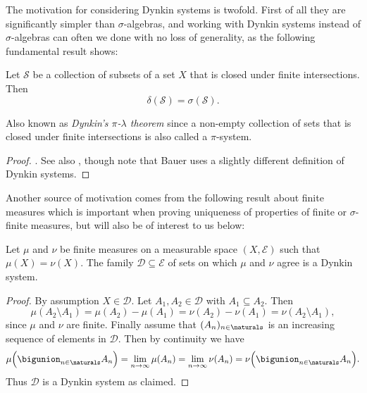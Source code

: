 \documentclass[article, a4paper, 11pt, oneside]{memoir}
\numberwithin{equation}{chapter}
\newcommand{\calE}{\mathcal{E}}
\newcommand{\calD}{\mathcal{D}}
\newcommand{\calS}{\mathcal{S}}
\begin{document}
The motivation for considering Dynkin systems is twofold. First of all they are significantly simpler than $\sigma$-algebras, and working with Dynkin systems instead of $\sigma$-algebras can often we done with no loss of generality, as the following fundamental result shows:

\begin{theorem}
    Let $\calS$ be a collection of subsets of a set $X$ that is closed under finite intersections. Then
    \begin{equation*}
        \delta(\calS) = \sigma(\calS).
    \end{equation*}
\end{theorem}
%
Also known as \emph{Dynkin's $\pi$-$\lambda$ theorem} since a non-empty collection of sets that is closed under finite intersections is also called a $\pi$-system.

\begin{proof}
    \textcite[Theorem~1.6.2]{cohn2001}. See also \textcite[Theorem~2.3]{bauer2001}, though note that Bauer uses a slightly different definition of Dynkin systems.
\end{proof}

Another source of motivation comes from the following result about finite measures which is important when proving uniqueness of properties of finite or $\sigma$-finite measures, but will also be of interest to us below:

\begin{lemma}
    \label{thm:finite-measures-agree-on-Dynkin}
    Let $\mu$ and $\nu$ be finite measures on a measurable space $(X,\calE)$ such that $\mu(X) = \nu(X)$. The family $\calD \subseteq \calE$ of sets on which $\mu$ and $\nu$ agree is a Dynkin system.
\end{lemma}

\begin{proof}
    By assumption $X \in \calD$. Let $A_1, A_2 \in \calD$ with $A_1 \subseteq A_2$. Then
    \begin{equation*}
        \mu(A_2 \setminus A_1)
            = \mu(A_2) - \mu(A_1)
            = \nu(A_2) - \nu(A_1)
            = \nu(A_2 \setminus A_1),
    \end{equation*}
    since $\mu$ and $\nu$ are finite. Finally assume that $(A_n)_{n\in\naturals}$ is an increasing sequence of elements in $\calD$. Then by continuity we have
    \begin{equation*}
        \mu \Bigl( \bigunion_{n\in\naturals} A_n \Bigr)
            = \lim_{n\to\infty} \mu(A_n)
            = \lim_{n\to\infty} \nu(A_n)
            = \nu \Bigl( \bigunion_{n\in\naturals} A_n \Bigr).
    \end{equation*}
    Thus $\calD$ is a Dynkin system as claimed.
\end{proof}
\end{document}
